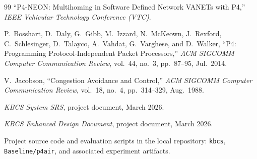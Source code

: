 \documentclass[12pt,a4paper]{report}
\begin{document}
\begin{thebibliography}{99}
``P4-NEON: Multihoming in Software Defined Network VANETs with P4,''
\textit{IEEE Vehicular Technology Conference (VTC)}.

P.~Bosshart, D.~Daly, G.~Gibb, M.~Izzard, N.~McKeown, J.~Rexford, C.~Schlesinger, D.~Talayco, A.~Vahdat, G.~Varghese, and D.~Walker,
``P4: Programming Protocol-Independent Packet Processors,''
\textit{ACM SIGCOMM Computer Communication Review}, vol.~44, no.~3, pp.~87--95, Jul.~2014.

V.~Jacobson,
``Congestion Avoidance and Control,''
\textit{ACM SIGCOMM Computer Communication Review}, vol.~18, no.~4, pp.~314--329, Aug.~1988.

\textit{KBCS System SRS}, project document, March 2026.

\textit{KBCS Enhanced Design Document}, project document, March 2026.

Project source code and evaluation scripts in the local repository: \texttt{kbcs}, \texttt{Baseline/p4air}, and associated experiment artifacts.

\end{thebibliography}
\end{document}
